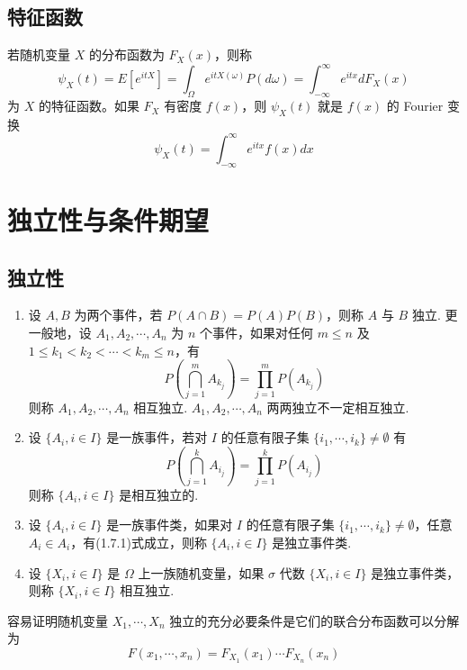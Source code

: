 \documentclass[lang=cn,10pt,thmcnt=section]{elegantbook}
\begin{document}
\subsection{特征函数}

\begin{definition}
	若随机变量 $X$ 的分布函数为 $F_X(x)$，则称
\[
\psi_X(t) = E[e^{itX}] = \int_{\Omega} e^{itX(\omega)} P(d\omega) = \int_{-\infty}^{\infty} e^{itx} dF_X(x)
\]
为 $X$ 的特征函数。如果 $F_X$ 有密度 $f(x)$，则 $\psi_X(t)$ 就是 $f(x)$ 的 Fourier 变换
\[
\psi_X(t) = \int_{-\infty}^{\infty} e^{itx} f(x) dx
\]
\end{definition}

\section{独立性与条件期望}
\subsection{独立性}
\begin{definition}
	\begin{enumerate}
		\item 设 $A, B$ 为两个事件，若 $P(A \cap B) = P(A)P(B)$，则称 $A$ 与 $B$ 独立. 更一般地，设 $A_1, A_2, \cdots, A_n$ 为 $n$ 个事件，如果对任何 $m \leq n$ 及 $1 \leq k_1 < k_2 < \cdots < k_m \leq n$，有
		\[
		P\left(\bigcap_{j=1}^{m} A_{k_j}\right) = \prod_{j=1}^{m} P(A_{k_j})
		\]
		则称 $A_1, A_2, \cdots, A_n$ 相互独立. $A_1, A_2, \cdots, A_n$ 两两独立不一定相互独立.
		\item 设 $\{A_i, i \in I\}$ 是一族事件，若对 $I$ 的任意有限子集 $\{i_1, \cdots, i_k\} \neq \emptyset$ 有
		\[
		P\left(\bigcap_{j=1}^{k} A_{i_j}\right) = \prod_{j=1}^{k} P(A_{i_j})\tag{1.7.1}
		\]
		则称 $\{A_i, i \in I\}$ 是相互独立的.
		\item 设 $\{A_i, i \in I\}$ 是一族事件类，如果对 $I$ 的任意有限子集 $\{i_1, \cdots, i_k\} \neq \emptyset$，任意 $A_i \in A_i$，有(1.7.1)式成立，则称 $\{A_i, i \in I\}$ 是独立事件类.
		\item 设 $\{X_i, i \in I\}$ 是 $\Omega$ 上一族随机变量，如果 $\sigma$ 代数 $\{X_i, i \in I\}$ 是独立事件类，则称 $\{X_i, i \in I\}$ 相互独立.
	\end{enumerate}
	
\end{definition}
容易证明随机变量 $X_1, \cdots, X_n$ 独立的充分必要条件是它们的联合分布函数可以分解为
	\[
	F(x_1, \cdots, x_n) = F_{X_1}(x_1) \cdots F_{X_n}(x_n)
	\]
\end{document}
